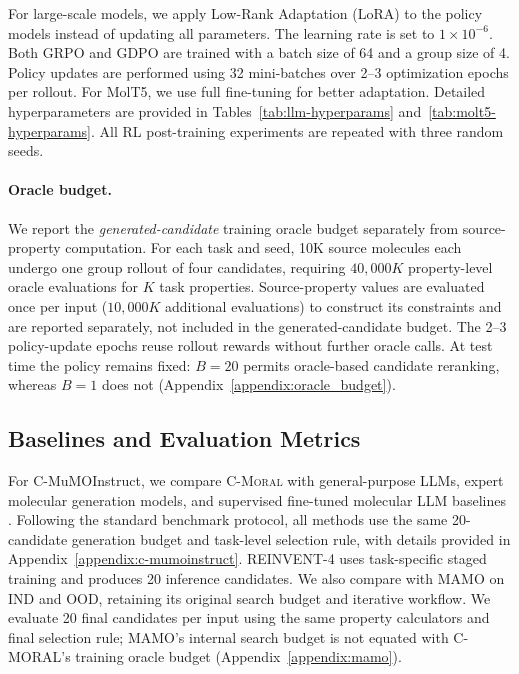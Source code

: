 \documentclass[11pt]{article}
\begin{document}
For large-scale models, we apply Low-Rank Adaptation (LoRA) \cite{hu2021loralowrankadaptationlarge} to the policy models instead of updating all parameters. The learning rate is set to $1 \times 10^{-6}$. Both GRPO and GDPO are trained with a batch size of 64 and a group size of 4. Policy updates are performed using 32 mini-batches over 2--3 optimization epochs per rollout. For MolT5, we use full fine-tuning for better adaptation. Detailed hyperparameters are provided in Tables~\ref{tab:llm-hyperparams} and~\ref{tab:molt5-hyperparams}. All RL post-training experiments are repeated with three random seeds.

\paragraph{Oracle budget.} We report the \emph{generated-candidate} training oracle budget separately from source-property computation. For each task and seed, 10K source molecules each undergo one group rollout of four candidates, requiring $40{,}000K$ property-level oracle evaluations for $K$ task properties. Source-property values are evaluated once per input ($10{,}000K$ additional evaluations) to construct its constraints and are reported separately, not included in the generated-candidate budget. The 2--3 policy-update epochs reuse rollout rewards without further oracle calls. At test time the policy remains fixed: $B=20$ permits oracle-based candidate reranking, whereas $B=1$ does not (Appendix~\ref{appendix:oracle_budget}). 


\subsection{Baselines and Evaluation Metrics}

For C-MuMOInstruct, we compare \textsc{C-Moral} with general-purpose LLMs, expert molecular generation models, and supervised fine-tuned molecular LLM baselines \cite{singh2026openaigpt5card, openai2024gpt4ocard, loeffler2024reinvent4, geminiteam2024gemini15unlockingmultimodal}. Following the standard benchmark protocol, all methods use the same 20-candidate generation budget and task-level selection rule, with details provided in Appendix~\ref{appendix:c-mumoinstruct}. REINVENT-4 uses task-specific staged training and produces 20 inference candidates. We also compare with MAMO \cite{zeng2026mamo} on IND and OOD, retaining its original search budget and iterative workflow. We evaluate 20 final candidates per input using the same property calculators and final selection rule; MAMO's internal search budget is not equated with C-MORAL's training oracle budget (Appendix~\ref{appendix:mamo}).
\end{document}
